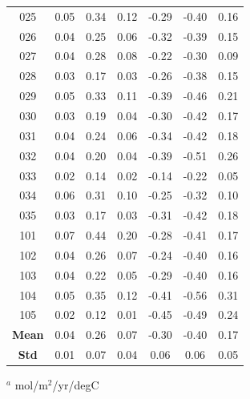 \documentclass[12pt]{article}
\begin{document}
\begin{table}[!h]
\begin{tabular}{c c c c | c c c}
	025 &   0.05 &     0.34 &       0.12 &  -0.29 &    -0.40 &       0.16 \\
	026 &   0.04 &     0.25 &       0.06 &  -0.32 &    -0.39 &       0.15 \\
	027 &   0.04 &     0.28 &       0.08 &  -0.22 &    -0.30 &       0.09 \\
	028 &   0.03 &     0.17 &       0.03 &  -0.26 &    -0.38 &       0.15 \\
	029 &   0.05 &     0.33 &       0.11 &  -0.39 &    -0.46 &       0.21 \\
	030 &   0.03 &     0.19 &       0.04 &  -0.30 &    -0.42 &       0.17 \\
	031 &   0.04 &     0.24 &       0.06 &  -0.34 &    -0.42 &       0.18 \\
	032 &   0.04 &     0.20 &       0.04 &  -0.39 &    -0.51 &       0.26 \\
	033 &   0.02 &     0.14 &       0.02 &  -0.14 &    -0.22 &       0.05 \\
	034 &   0.06 &     0.31 &       0.10 &  -0.25 &    -0.32 &       0.10 \\
	035 &   0.03 &     0.17 &       0.03 &  -0.31 &    -0.42 &       0.18 \\
	101 &   0.07 &     0.44 &       0.20 &  -0.28 &    -0.41 &       0.17 \\
	102 &   0.04 &     0.26 &       0.07 &  -0.24 &    -0.40 &       0.16 \\
	103 &   0.04 &     0.22 &       0.05 &  -0.29 &    -0.40 &       0.16 \\
	104 &   0.05 &     0.35 &       0.12 &  -0.41 &    -0.56 &       0.31 \\
	105 &   0.02 &     0.12 &       0.01 &  -0.45 &    -0.49 &       0.24 \\
	\bottomrule
	\textbf{Mean} & 0.04 & 0.26 & 0.07 & -0.30 & -0.40 & 0.17 \\
	\textbf{Std} & 0.01 & 0.07 & 0.04 & 0.06 & 0.06 & 0.05
\end{tabular}
\begin{tablenotes}
	\centering
	\item $^{a}$ mol/m$^{2}$/yr/degC
\end{tablenotes}
\label{tab:enso-pacific}
\end{table}
\end{document}
